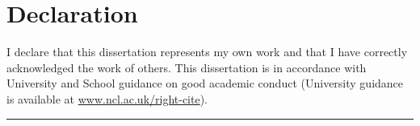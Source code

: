 

\chapter*{Declaration} %

I declare that this dissertation represents my own work and that I have correctly acknowledged the work of others. This dissertation is in accordance with University and School guidance on good academic conduct (University guidance is available at \url{www.ncl.ac.uk/right-cite}).

\vspace{1.5cm}

\rule{0.7 \linewidth}{1pt}\\
\vspace{0.25cm}

\cleardoublepage